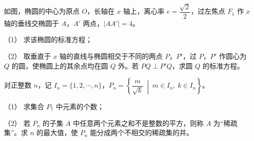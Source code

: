 \begin{question}
如图，椭圆的中心为原点 $O$，长轴在 $x$ 轴上，离心率 $e=\dfrac{\sqrt2}2$，过左焦点 $F_1$ 作 $x$ 轴的垂线交椭圆于 $A$，$A'$ 两点，$|AA'|=4$。

（1） 求该椭圆的标准方程；

（2） 取垂直于 $x$ 轴的直线与椭圆相交于不同的两点 $P$，$P'$，过 $P$，$P'$ 作圆心为 $Q$ 的圆，使椭圆上的其余点均在圆 $Q$ 外。若 $PQ\perp P'Q$，求圆 $Q$ 的标准方程。
\nopagebreak[4]
\begin{center}\end{center}
\nopagebreak[4]
\end{question}
\begin{question}
对正整数 $n$，记 $I_n=\{1,2,\cdots,n\}$，$P_n=\left\{\dfrac{m}{\sqrt k}\ \middle|\ m\in I_n,\ k\in I_n\right\}$。

（1） 求集合 $P_7$ 中元素的个数；

（2） 若 $P_n$ 的子集 $A$ 中任意两个元素之和不是整数的平方，则称 $A$ 为“稀疏集”。求 $n$ 的最大值，使 $P_n$ 能分成两个不相交的稀疏集的并。

\end{question}